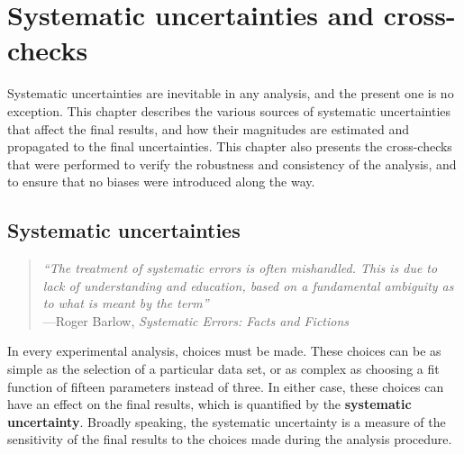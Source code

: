 \chapter{Systematic uncertainties and cross-checks}
\label{chapter_systematics}
Systematic uncertainties are inevitable in any analysis, and the present one is no exception. This chapter describes the various sources of systematic uncertainties that affect the final results, and how their magnitudes are estimated and propagated to the final uncertainties. This chapter also presents the cross-checks that were performed to verify the robustness and consistency of the analysis, and to ensure that no biases were introduced along the way.

\section{Systematic uncertainties}
\label{sec:systematics}
\begin{quote}
    \textit{``The treatment of systematic errors is often mishandled. This is due to lack of understanding and education, based on a fundamental ambiguity as to what is meant by the term''}\\
    \hspace*{1cm}---Roger Barlow, \textit{Systematic Errors: Facts and Fictions}~\cite{BarlowCheck}
\end{quote}

In every experimental analysis, choices must be made. These choices can be as simple as the selection of a particular data set, or as complex as choosing a fit function of fifteen parameters instead of three. In either case, these choices can have an effect on the final results, which is quantified by the \textbf{systematic uncertainty}. Broadly speaking, the systematic uncertainty is a measure of the sensitivity of the final results to the choices made during the analysis procedure. 

